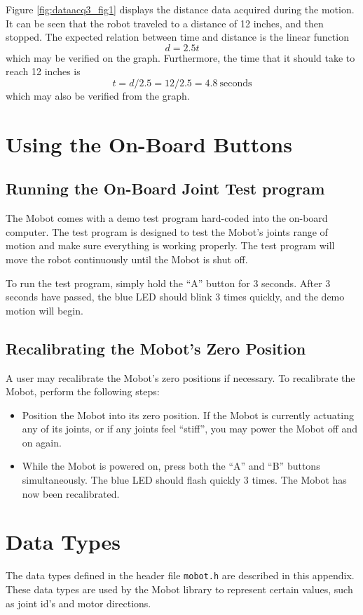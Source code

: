 \documentclass{article}
\begin{document}
Figure \ref{fig:dataacq3_fig1} displays the distance data acquired during the motion. It can
be seen that the robot traveled to a distance of 12 inches, and then stopped. The
expected relation between time and distance is the linear function 
\begin{equation*}
d = 2.5t
\end{equation*}
which may be verified on the graph. Furthermore, the time that it should take to reach 
12 inches is 
\begin{equation}
t = d / 2.5 = 12 / 2.5 = 4.8 ~\text{seconds}
\end{equation}
which may also be verified from the graph.

\section{Using the On-Board Buttons}
\subsection{Running the On-Board Joint Test program}
The Mobot comes with a demo test program hard-coded into the on-board
computer. The test program is designed to test the Mobot's joints range of 
motion and make sure everything is working properly. The test program will
move the robot continuously until the Mobot is shut off.

To run the test program, simply hold the ``A'' button for 3 seconds. After
3 seconds have passed, the blue LED should blink 3 times quickly, and the
demo motion will begin.

\subsection{Recalibrating the Mobot's Zero Position}
A user may recalibrate the Mobot's zero positions if necessary. To recalibrate
the Mobot, perform the following steps:
\begin{itemize}
\item Position the Mobot into its zero position. If the Mobot is currently
actuating any of its joints, or if any joints feel ``stiff'', you may power the
Mobot off and on again.
\item While the Mobot is powered on, press both the ``A'' and ``B'' buttons
simultaneously. The blue LED should flash quickly 3 times. The Mobot has now
been recalibrated.
\end{itemize}

\newpage
\appendix
\section{\label{sec:datatypes}Data Types}
The data types defined in the header file \texttt{mobot.h} are described in
this appendix.
These data types are used by the Mobot library to represent 
certain values, such as joint id's and motor directions.
\end{document}
